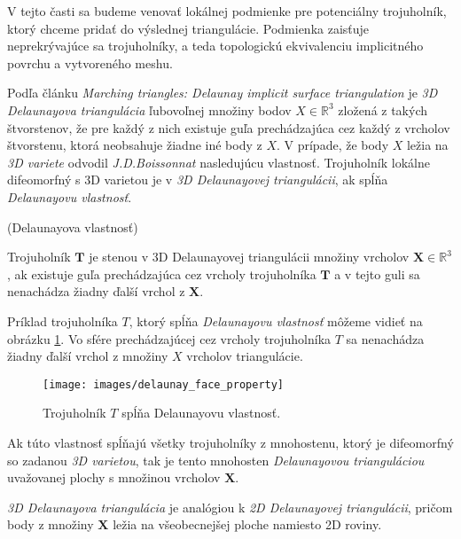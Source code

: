 V tejto časti sa budeme venovať lokálnej podmienke pre potenciálny trojuholník, ktorý chceme pridať do 
výslednej triangulácie. Podmienka zaisťuje neprekrývajúce sa trojuholníky, a teda topologickú 
ekvivalenciu implicitného povrchu a vytvoreného meshu.

Podľa článku \textit{Marching triangles: Delaunay implicit surface triangulation} \cite{hilton1997marching} 
je \textit{3D Delaunayova triangulácia} ľubovoľnej množiny bodov $X\in \mathbb{R}^3$
zložená z takých štvorstenov, že pre každý z nich existuje guľa prechádzajúca cez každý z vrcholov 
štvorstenu, ktorá neobsahuje žiadne iné body z $X$. V prípade, že body $X$ ležia na \textit{3D variete} 
odvodil \textit{J.D.Boissonnat} \cite{boissonnat1984geometric} nasledujúcu vlastnosť. Trojuholník
lokálne difeomorfný s 3D varietou je v \textit{3D Delaunayovej triangulácii}, ak spĺňa 
\textit{Delaunayovu vlastnosť}.

\begin{definition}
    (Delaunayova vlastnosť)

    Trojuholník $\mathbf{T}$ je stenou v 3D Delaunayovej triangulácii množiny vrcholov 
    $\mathbf{X}\in \mathbb{R}^3$, ak existuje guľa prechádzajúca cez vrcholy trojuholníka 
    $\mathbf{T}$ a v tejto guli sa nenachádza žiadny ďalší vrchol z $\mathbf{X}$. 
\end{definition}

Príklad trojuholníka $T$, ktorý spĺňa \textit{Delaunayovu vlastnosť} môžeme vidieť na obrázku 
\ref{obr:delaunay_face_property}. Vo sfére prechádzajúcej cez vrcholy trojuholníka $T$ 
sa nenachádza žiadny ďalší vrchol z množiny $X$ vrcholov triangulácie.

\begin{figure}
    \centerline{\texttt{[image: images/delaunay\_face\_property]}}
    \caption[Trojuholník $T$ spĺňajúci Delaunayovu vlastnosť]
    {\cite{hilton1996marching} Trojuholník $T$ spĺňa Delaunayovu vlastnosť.}
    \label{obr:delaunay_face_property}
\end{figure}

Ak túto vlastnosť spĺňajú všetky trojuholníky z mnohostenu, ktorý je difeomorfný so zadanou
\textit{3D varietou}, tak je tento mnohosten \textit{Delaunayovou trianguláciou} uvažovanej plochy
s množinou vrcholov $\mathbf{X}$.

\textit{3D Delaunayova triangulácia} je analógiou k \textit{2D Delaunayovej triangulácii}, pričom
body z množiny $\mathbf{X}$ ležia na všeobecnejšej ploche namiesto 2D roviny.

